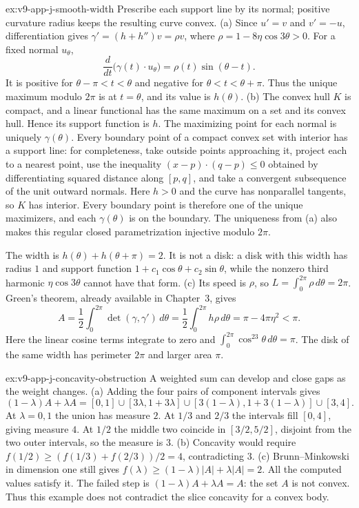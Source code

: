 \begin{solution}{ex:v9-app-j-smooth-width}
\idea Prescribe each support line by its normal; positive curvature radius keeps the resulting curve convex.
\writeup (a) Since $u'=v$ and $v'=-u$, differentiation gives $\gamma'=(h+h'')v=\rho v$, where $\rho=1-8\eta\cos3\theta>0$. For a fixed normal $u_\theta$,
\[
\frac d{dt}\bigl(\gamma(t)\cdot u_\theta\bigr)=\rho(t)\sin(\theta-t).
\]
It is positive for $\theta-\pi<t<\theta$ and negative for $\theta<t<\theta+\pi$. Thus the unique maximum modulo $2\pi$ is at $t=\theta$, and its value is $h(\theta)$.
(b) The convex hull $K$ is compact, and a linear functional has the same maximum on a set and its convex hull. Hence its support function is $h$. The maximizing point for each normal is uniquely $\gamma(\theta)$. Every boundary point of a compact convex set with interior has a support line: for completeness, take outside points approaching it, project each to a nearest point, use the inequality $(x-p)\cdot(q-p)\le0$ obtained by differentiating squared distance along $[p,q]$, and take a convergent subsequence of the unit outward normals. Here $h>0$ and the curve has nonparallel tangents, so $K$ has interior. Every boundary point is therefore one of the unique maximizers, and each $\gamma(\theta)$ is on the boundary. The uniqueness from (a) also makes this regular closed parametrization injective modulo $2\pi$.

The width is $h(\theta)+h(\theta+\pi)=2$. It is not a disk: a disk with this width has radius $1$ and support function $1+c_1\cos\theta+c_2\sin\theta$, while the nonzero third harmonic $\eta\cos3\theta$ cannot have that form.
(c) Its speed is $\rho$, so $L=\int_0^{2\pi}\rho\,d\theta=2\pi$. Green's theorem, already available in Chapter~3, gives
\[
A=\frac12\int_0^{2\pi}\det(\gamma,\gamma')\,d\theta
=\frac12\int_0^{2\pi}h\rho\,d\theta
=\pi-4\pi\eta^2<\pi.
\]
Here the linear cosine terms integrate to zero and $\int_0^{2\pi}\cos^23\theta\,d\theta=\pi$. The disk of the same width has perimeter $2\pi$ and larger area $\pi$.
\end{solution}

\begin{solution}{ex:v9-app-j-concavity-obstruction}
\idea A weighted sum can develop and close gaps as the weight changes.
\writeup (a) Adding the four pairs of component intervals gives
\[
(1-\lambda)A+\lambda A
=[0,1]\cup[3\lambda,1+3\lambda]
\cup[3(1-\lambda),1+3(1-\lambda)]\cup[3,4].
\]
At $\lambda=0,1$ the union has measure $2$. At $1/3$ and $2/3$ the intervals fill $[0,4]$, giving measure $4$. At $1/2$ the middle two coincide in $[3/2,5/2]$, disjoint from the two outer intervals, so the measure is $3$.
(b) Concavity would require $f(1/2)\ge(f(1/3)+f(2/3))/2=4$, contradicting $3$.
(c) Brunn--Minkowski in dimension one still gives $f(\lambda)\ge(1-\lambda)|A|+\lambda|A|=2$. All the computed values satisfy it. The failed step is $(1-\lambda)A+\lambda A=A$: the set $A$ is not convex. Thus this example does not contradict the slice concavity for a convex body.
\end{solution}

